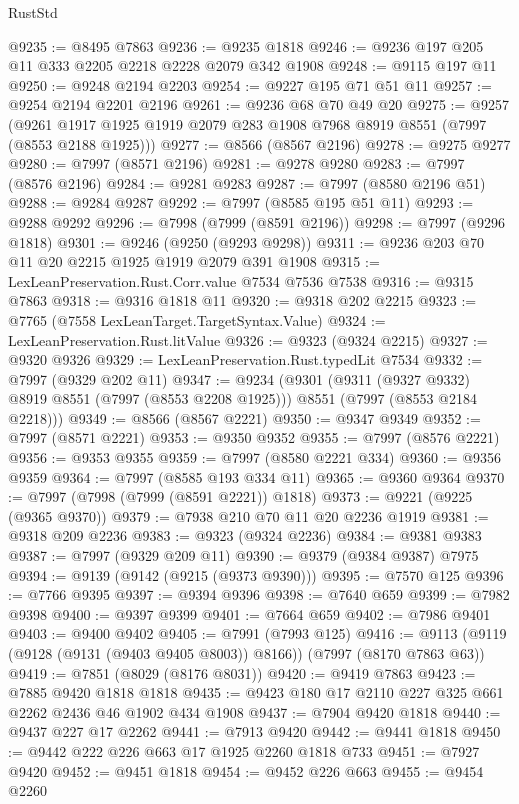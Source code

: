 \begin{lexlean}{RustStd}
\begin{coremodule}
@9235 := @8495 @7863
@9236 := @9235 @1818
@9246 := @9236 @197 @205 @11 @333 @2205 @2218 @2228 @2079 @342 @1908
@9248 := @9115 @197 @11
@9250 := @9248 @2194 @2203
@9254 := @9227 @195 @71 @51 @11
@9257 := @9254 @2194 @2201 @2196
@9261 := @9236 @68 @70 @49 @20
@9275 := @9257
    (@9261 @1917 @1925 @1919 @2079 @283 @1908 @7968 @8919 @8551 (@7997 (@8553 @2188 @1925)))
@9277 := @8566 (@8567 @2196)
@9278 := @9275 @9277
@9280 := @7997 (@8571 @2196)
@9281 := @9278 @9280
@9283 := @7997 (@8576 @2196)
@9284 := @9281 @9283
@9287 := @7997 (@8580 @2196 @51)
@9288 := @9284 @9287
@9292 := @7997 (@8585 @195 @51 @11)
@9293 := @9288 @9292
@9296 := @7998 (@7999 (@8591 @2196))
@9298 := @7997 (@9296 @1818)
@9301 := @9246 (@9250 (@9293 @9298))
@9311 := @9236 @203 @70 @11 @20 @2215 @1925 @1919 @2079 @391 @1908
@9315 := LexLeanPreservation.Rust.Corr.value @7534 @7536 @7538
@9316 := @9315 @7863
@9318 := @9316 @1818 @11
@9320 := @9318 @202 @2215
@9323 := @7765 (@7558 LexLeanTarget.TargetSyntax.Value)
@9324 := LexLeanPreservation.Rust.litValue
@9326 := @9323 (@9324 @2215)
@9327 := @9320 @9326
@9329 := LexLeanPreservation.Rust.typedLit @7534
@9332 := @7997 (@9329 @202 @11)
@9347 := @9234
    (@9301
      (@9311 (@9327 @9332) @8919 @8551 (@7997 (@8553 @2208 @1925)))
      @8551
      (@7997 (@8553 @2184 @2218)))
@9349 := @8566 (@8567 @2221)
@9350 := @9347 @9349
@9352 := @7997 (@8571 @2221)
@9353 := @9350 @9352
@9355 := @7997 (@8576 @2221)
@9356 := @9353 @9355
@9359 := @7997 (@8580 @2221 @334)
@9360 := @9356 @9359
@9364 := @7997 (@8585 @193 @334 @11)
@9365 := @9360 @9364
@9370 := @7997 (@7998 (@7999 (@8591 @2221)) @1818)
@9373 := @9221 (@9225 (@9365 @9370))
@9379 := @7938 @210 @70 @11 @20 @2236 @1919
@9381 := @9318 @209 @2236
@9383 := @9323 (@9324 @2236)
@9384 := @9381 @9383
@9387 := @7997 (@9329 @209 @11)
@9390 := @9379 (@9384 @9387) @7975
@9394 := @9139 (@9142 (@9215 (@9373 @9390)))
@9395 := @7570 @125
@9396 := @7766 @9395
@9397 := @9394 @9396
@9398 := @7640 @659
@9399 := @7982 @9398
@9400 := @9397 @9399
@9401 := @7664 @659
@9402 := @7986 @9401
@9403 := @9400 @9402
@9405 := @7991 (@7993 @125)
@9416 := @9113 (@9119 (@9128 (@9131 (@9403 @9405 @8003)) @8166)) (@7997 (@8170 @7863 @63))
@9419 := @7851 (@8029 (@8176 @8031))
@9420 := @9419 @7863
@9423 := @7885 @9420 @1818 @1818
@9435 := @9423 @180 @17 @2110 @227 @325 @661 @2262 @2436 @46 @1902 @434 @1908
@9437 := @7904 @9420 @1818
@9440 := @9437 @227 @17 @2262
@9441 := @7913 @9420
@9442 := @9441 @1818
@9450 := @9442 @222 @226 @663 @17 @1925 @2260 @1818 @733
@9451 := @7927 @9420
@9452 := @9451 @1818
@9454 := @9452 @226 @663
@9455 := @9454 @2260

\end{coremodule}
\end{lexlean}
